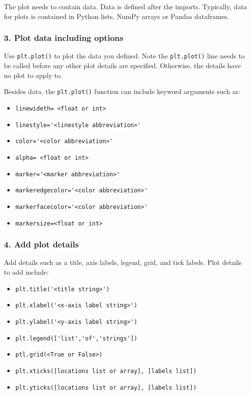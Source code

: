 \documentclass{book}
\providecommand{\tightlist}{%
      \setlength{\itemsep}{0pt}\setlength{\parskip}{0pt}}
\newcommand{\passthrough}[1]{#1}
\begin{document}
The plot needs to contain data. Data is defined after the imports.
Typically, data for plots is contained in Python lists, NumPy arrays or
Pandas dataframes.

\hypertarget{plot-data-including-options}{%
\subsubsection{3. Plot data including
options}\label{plot-data-including-options}}

Use \passthrough{\lstinline!plt.plot()!} to plot the data you defined.
Note the \passthrough{\lstinline!plt.plot()!} line needs to be called
before any other plot details are specified. Otherwise, the details have
no plot to apply to.

Besides data, the \passthrough{\lstinline!plt.plot()!} function can
include keyword arguments such as:

\begin{itemize}
\tightlist
\item
  \passthrough{\lstinline!linewideth= <float or int>!}
\item
  \passthrough{\lstinline!linestyle='<linestyle abbreviation>'!}
\item
  \passthrough{\lstinline!color='<color abbreviation>'!}
\item
  \passthrough{\lstinline!alpha= <float or int>!}
\item
  \passthrough{\lstinline!marker='<marker abbreviation>'!}
\item
  \passthrough{\lstinline!markeredgecolor='<color abbreviation>'!}
\item
  \passthrough{\lstinline!markerfacecolor='<color abbreviation>'!}
\item
  \passthrough{\lstinline!markersize=<float or int>!}
\end{itemize}

\hypertarget{add-plot-details}{%
\subsubsection{4. Add plot details}\label{add-plot-details}}

Add details such as a title, axis labels, legend, grid, and tick labels.
Plot details to add include:

\begin{itemize}
\tightlist
\item
  \passthrough{\lstinline!plt.title('<title string>')!}
\item
  \passthrough{\lstinline!plt.xlabel('<x-axis label string>')!}
\item
  \passthrough{\lstinline!plt.ylabel('<y-axis label string>')!}
\item
  \passthrough{\lstinline!plt.legend(['list','of','strings'])!}
\item
  \passthrough{\lstinline!ptl.grid(<True or False>)!}
\item
  \passthrough{\lstinline!plt.xticks([locations list or array], [labels list])!}
\item
  \passthrough{\lstinline!plt.yticks([locations list or array], [labels list])!}
\end{itemize}
\end{document}
